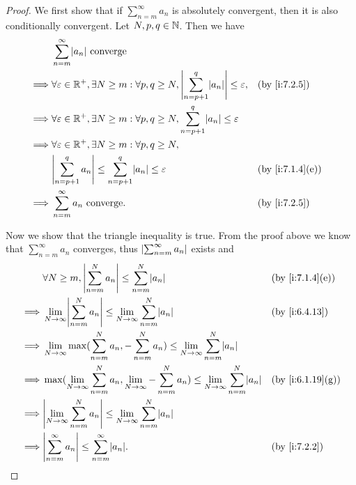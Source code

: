 \begin{proof}
  We first show that if \(\sum_{n = m}^\infty a_n\) is absolutely convergent, then it is also conditionally convergent.
  Let \(N, p, q \in \mathbb{N}\).
  Then we have
  \begin{align*}
             & \sum_{n = m}^\infty \abs{a_n} \text{ converge}                                                                                                  \\
    \implies & \forall \varepsilon \in \R^+, \exists N \geq m : \forall p, q \geq N, \abs{\sum_{n = p + 1}^q \abs{a_n}} \leq \varepsilon, &  & \by{i:7.2.5}    \\
    \implies & \forall \varepsilon \in \R^+, \exists N \geq m : \forall p, q \geq N, \sum_{n = p + 1}^q \abs{a_n} \leq \varepsilon                             \\
    \implies & \forall \varepsilon \in \R^+, \exists N \geq m : \forall p, q \geq N,                                                                           \\
             & \abs{\sum_{n = p + 1}^q a_n} \leq \sum_{n = p + 1}^q \abs{a_n} \leq \varepsilon                                            &  & \by{i:7.1.4}[e] \\
    \implies & \sum_{n = m}^\infty a_n \text{ converge}.                                                                                  &  & \by{i:7.2.5}
  \end{align*}

  Now we show that the triangle inequality is true.
  From the proof above we know that \(\sum_{n = m}^\infty a_n\) converges, thus \(\left\lvert\sum_{n = m}^\infty a_n\right\rvert\) exists and
  \begin{align*}
             & \forall N \geq m, \abs{\sum_{n = m}^N a_n} \leq \sum_{n = m}^N \abs{a_n}                                                                &  & \by{i:7.1.4}[e]  \\
    \implies & \lim_{N \to \infty} \abs{\sum_{n = m}^N a_n} \leq \lim_{N \to \infty} \sum_{n = m}^N \abs{a_n}                                          &  & \by{i:6.4.13}    \\
    \implies & \lim_{N \to \infty} \max(\sum_{n = m}^N a_n, -\sum_{n = m}^N a_n) \leq \lim_{N \to \infty} \sum_{n = m}^N \abs{a_n}                                           \\
    \implies & \max(\lim_{N \to \infty} \sum_{n = m}^N a_n, \lim_{N \to \infty} -\sum_{n = m}^N a_n) \leq \lim_{N \to \infty} \sum_{n = m}^N \abs{a_n} &  & \by{i:6.1.19}[g] \\
    \implies & \abs{\lim_{N \to \infty} \sum_{n = m}^N a_n} \leq \lim_{N \to \infty} \sum_{n = m}^N \abs{a_n}                                                                \\
    \implies & \abs{\sum_{n = m}^\infty a_n} \leq \sum_{n = m}^\infty \abs{a_n}.                                                                       &  & \by{i:7.2.2}
  \end{align*}
\end{proof}

